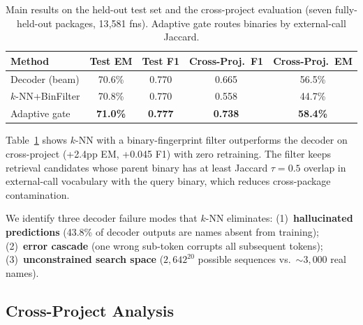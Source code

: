 \documentclass[sigconf,nonacm]{acmart}
\begin{document}
\begin{table}[t]
    \centering
    \caption{Main results on the held-out test set and the cross-project evaluation (seven fully-held-out packages, 13{,}581 fns). Adaptive gate routes binaries by external-call Jaccard.}
    \label{tab:main}
    \footnotesize
    \setlength{\tabcolsep}{3pt}
    \begin{tabular}{@{}lcccc@{}}
        \toprule
        \textbf{Method} & \textbf{Test EM} & \textbf{Test F1} & \textbf{Cross-Proj.\ F1} & \textbf{Cross-Proj.\ EM} \\
        \midrule
        Decoder (beam) & 70.6\% & 0.770 & 0.665 & 56.5\% \\
        $k$-NN+BinFilter & 70.8\% & 0.770 & 0.558 & 44.7\% \\
        Adaptive gate & \textbf{71.0\%} & \textbf{0.777} & \textbf{0.738} & \textbf{58.4\%} \\
        \bottomrule
    \end{tabular}
\end{table}

Table~\ref{tab:main} shows $k$-NN with a binary-fingerprint filter outperforms the decoder on cross-project (+2.4pp EM, +0.045 F1) with zero retraining. The filter keeps retrieval candidates whose parent binary has at least Jaccard $\tau{=}0.5$ overlap in external-call vocabulary with the query binary, which reduces cross-package contamination.

We identify three decoder failure modes that $k$-NN eliminates: (1)~\textbf{hallucinated predictions} (43.8\% of decoder outputs are names absent from training); (2)~\textbf{error cascade} (one wrong sub-token corrupts all subsequent tokens); (3)~\textbf{unconstrained search space} ($2{,}642^{20}$ possible sequences vs.\ ${\sim}3{,}000$ real names).

\subsection{Cross-Project Analysis}
\end{document}
